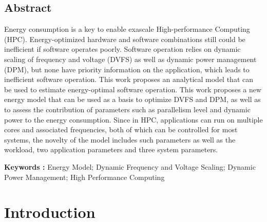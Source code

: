 \documentclass{report}
\begin{document}
% 

\umonsCoverPage


\section*{Abstract}
Energy consumption is a key to enable exascale High-performance Computing (HPC). Energy-optimized hardware and software combinations still could be inefficient if software operates poorly. 
Software operation relies on dynamic scaling of frequency and voltage (DVFS) as well as dynamic power management (DPM), but none have priority information on the application, which leads to inefficient software operation. This work proposes an analytical model that can be used to estimate energy-optimal software operation. 
This work proposes a new energy model that can be used as a basis to optimize DVFS and DPM, as well as to assess the contribution of parameters such as parallelism level and dynamic power to the energy consumption.
Since in HPC, applications can run on multiple cores and associated frequencies, both of which can be controlled for most systems, the novelty of the model includes such parameters as well as the workload, two application parameters and three system parameters.

\vspace{2cm}
\textbf{Keywords :} Energy Model; Dynamic Frequency and Voltage Scaling; Dynamic Power Management; High Performance Computing
\newpage

\tableofcontents
\newpage
\listoffigures
\newpage
\listoftables
\newpage

\chapter{Introduction}
\end{document}
